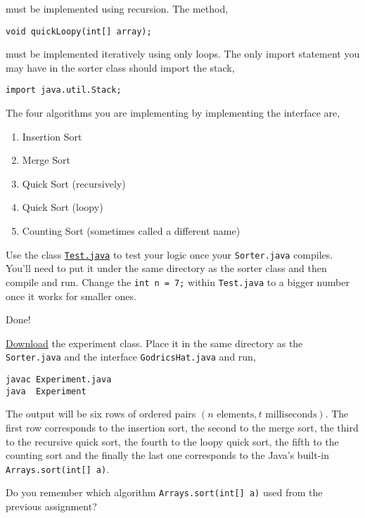 \documentclass{homework}
\newcommand\download{\href{%
    https://tashfeen.org/s/ds/Experiment.java%
  }{Download}}
\begin{document}
must be implemented using recursion. The method,

\begin{verbatim}
void quickLoopy(int[] array);
\end{verbatim}

must be implemented iteratively \ie using only loops. The only
import statement you may have in the sorter class should import
the stack,

\begin{verbatim}
import java.util.Stack;
\end{verbatim}

The four algorithms you are implementing by implementing the
interface are,

\begin{enumerate}
  \item Insertion Sort
  \item Merge Sort
  \item Quick Sort (recursively)
  \item Quick Sort (loopy)
  \item Counting Sort (sometimes called a different name)
\end{enumerate}

Use the class
\href{https://tashfeen.org/s/ds/Test.java}{\texttt{Test.java}}
to test your logic once your \texttt{Sorter.java} compiles. You'll
need to put it under the same directory as the sorter class and
then compile and run. Change the \texttt{int n = 7;} within
\texttt{Test.java} to a bigger number once it works for smaller
ones.

\begin{sol}
  Done!
\end{sol}

\question\label{plot} \download{} the experiment class. Place it in
the same directory as the \texttt{Sorter.java} and the interface
\texttt{GodricsHat.java} and run,
\begin{verbatim}
javac Experiment.java
java  Experiment
\end{verbatim}

The output will be six rows of ordered pairs $(n \text{ elements},
  t \text{ milliseconds})$. The first row corresponds to the
insertion sort, the second to the merge sort, the third to the
recursive quick sort, the fourth to the loopy quick sort, the
fifth to the counting sort and the finally the last one
corresponds to the Java's built-in \texttt{Arrays.sort(int[] a)}.

Do you remember which algorithm \texttt{Arrays.sort(int[] a)} used
from the previous assignment?
\end{document}

